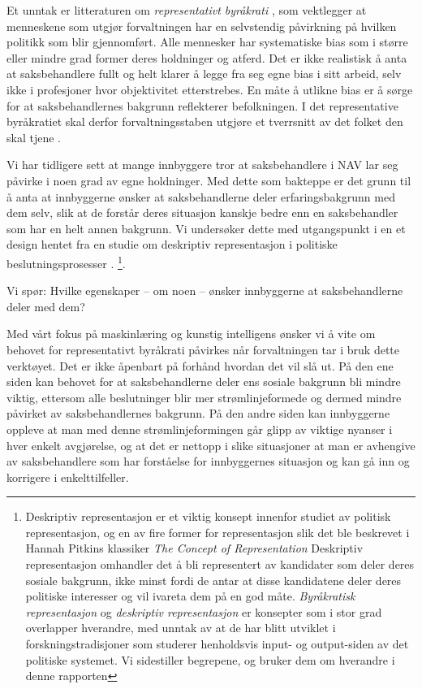 \documentclass[
]{book}
\begin{document}
Et unntak er litteraturen om \emph{representativt byråkrati} \citep{krislov2012representative, lim2006representative}, som vektlegger at menneskene som utgjør forvaltningen har en selvstendig påvirkning på hvilken politikk som blir gjennomført.
Alle mennesker har systematiske bias som i større eller mindre grad former deres holdninger og atferd.
Det er ikke realistisk å anta at saksbehandlere fullt og helt klarer å legge fra seg egne bias i sitt arbeid, selv ikke i profesjoner hvor objektivitet etterstrebes.
En måte å utlikne bias er å sørge for at saksbehandlernes bakgrunn reflekterer befolkningen.
I det representative byråkratiet skal derfor forvaltningsstaben utgjøre et tverrsnitt av det folket den skal tjene \citep{laegreid1978byraakrati, christensen2001profesjoner}.

Vi har tidligere sett at mange innbyggere tror at saksbehandlere i NAV lar seg påvirke i noen grad av egne holdninger.
Med dette som bakteppe er det grunn til å anta at innbyggerne ønsker at saksbehandlerne deler erfaringsbakgrunn med dem selv, slik at de forstår deres situasjon kanskje bedre enn en saksbehandler som har en helt annen bakgrunn.
Vi undersøker dette med utgangspunkt i en et design hentet fra en studie om deskriptiv representasjon i politiske beslutningsprosesser \citep{arnesen2018legitimacy}. \footnote{Deskriptiv representasjon er et viktig konsept innenfor studiet av politisk representasjon, og en av fire former for representasjon slik det ble beskrevet i Hannah Pitkins klassiker \emph{The Concept of Representation} \citeyearpar{pitkin1967concept}
  Deskriptiv representasjon omhandler det å bli representert av kandidater som deler deres sosiale bakgrunn, ikke minst fordi de antar at disse kandidatene deler deres politiske interesser og vil ivareta dem på en god måte.
  \emph{Byråkratisk representasjon} og \emph{deskriptiv representasjon} er konsepter som i stor grad overlapper hverandre, med unntak av at de har blitt utviklet i forskningstradisjoner som studerer henholdsvis input- og output-siden av det politiske systemet.
  Vi sidestiller begrepene, og bruker dem om hverandre i denne rapporten}.

Vi spør:
Hvilke egenskaper -- om noen -- ønsker innbyggerne at saksbehandlerne deler med dem?

Med vårt fokus på maskinlæring og kunstig intelligens ønsker vi å vite om behovet for representativt byråkrati påvirkes når forvaltningen tar i bruk dette verktøyet.
Det er ikke åpenbart på forhånd hvordan det vil slå ut.
På den ene siden kan behovet for at saksbehandlerne deler ens sosiale bakgrunn bli mindre viktig, ettersom alle beslutninger blir mer strømlinjeformede og dermed mindre påvirket av saksbehandlernes bakgrunn.
På den andre siden kan innbyggerne oppleve at man med denne strømlinjeformingen går glipp av viktige nyanser i hver enkelt avgjørelse, og at det er nettopp i slike situasjoner at man er avhengive av saksbehandlere som har forståelse for innbyggernes situasjon og kan gå inn og korrigere i enkelttilfeller.
\end{document}
